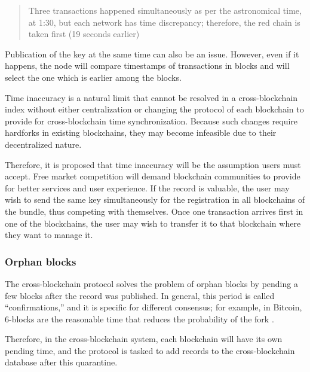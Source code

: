 \begin{multicols}{2}
\begin{quote}
Three transactions happened simultaneously as per the astronomical time, at 1:30, but each network has time discrepancy; therefore, the red chain is taken first (19 seconds earlier)
\end{quote}

Publication of the key at the same time can also be an issue. However, even if it happens, the node will compare timestamps of transactions in blocks and will select the one which is earlier among the blocks.

Time inaccuracy is a natural limit that cannot be resolved in a cross-blockchain index without either centralization or changing the protocol of each blockchain to provide for cross-blockchain time synchronization. Because such changes require hardforks in existing blockchains, they may become infeasible due to their decentralized nature.

Therefore, it is proposed that time inaccuracy will be the assumption users must accept. Free market competition will demand blockchain communities to provide for better services and user experience. If the record is valuable, the user may wish to send the same key simultaneously for the registration in all blockchains of the bundle, thus competing with themselves. Once one transaction arrives first in one of the blockchains, the user may wish to transfer it to that blockchain where they want to manage it.

\setcounter{secnumdepth}{5}
\renewcommand\thesubsubsection{\arabic{section}.\arabic{subsection}.\alph{subsubsection}}

\vspace{-.6cm}

\subsubsection{Orphan blocks}\label{subsubsec-4.3.c}

\vspace{-.4cm}

The cross-blockchain protocol solves the problem of orphan blocks by pending a few blocks after the record was published. In general, this period is called “confirmations,” and it is specific for different consensus; for example, in Bitcoin, 6-blocks are the reasonable time that reduces the probability of the fork \cite{art1-key40}.

Therefore, in the cross-blockchain system, each blockchain will have its own pending time, and the protocol is tasked to add records to the cross-blockchain database after this quarantine.


\end{multicols}
